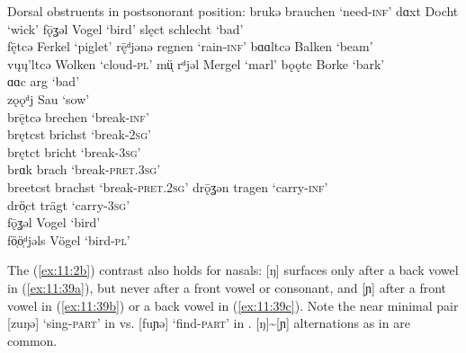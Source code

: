 \ea%
\label{ex:11:38}Dorsal obstruents in postsonorant position:
\ea\label{ex:11:38a} brukǝ \tab [brukǝ] \tab brauchen \tab ‘need-\textsc{inf}’ 
\ex\label{ex:11:38b} dɑxt \tab [dɑxt] \tab Docht \tab ‘wick’ 
\ex\label{ex:11:38c} fǭʓəl \tab [fɔːɣəl] \tab Vogel \tab ‘bird’ 
\ex\label{ex:11:38d} slęct \tab [slɛçt] \tab schlecht \tab ‘bad’ \\
    f\={ę}tcə \tab [fɛːçə] \tab Ferkel \tab ‘piglet’ 
\ex\label{ex:11:38e} r\={ę}ᵈjənə \tab [rɛːʝənə] \tab regnen \tab ‘rain-\textsc{inf}’ 
\ex\label{ex:11:38f} bɑɑltcə \tab [bɑːlçə] \tab Balken \tab ‘beam’ \\
    vųų’ltcə \tab [vʊːlçə] \tab Wolken \tab ‘cloud-\textsc{pl}’ 
\ex\label{ex:11:38g} müͅ\textsuperscript{} rᵈjəl \tab [mʏrʝəl] \tab Mergel \tab ‘marl’ 
\ex\label{ex:11:38h} bǫǫtc \tab [bɔːç] \tab Borke \tab ‘bark’ \\
    ɑɑc \tab [ɑːç] \tab arg \tab ‘bad’ \\
\ex\label{ex:11:38i}  zǫǫᵈj \tab [zɔːʝ] \tab Sau \tab ‘sow’ \\
\ex\label{ex:11:38j}    br\={ę}tcə \tab [breːçə] \tab brechen \tab ‘break-\textsc{inf}’ \\
    brętcst \tab [brɛçst] \tab brichst \tab ‘break-\textsc{2sg}’ \\
    brętct \tab [brɛçt] \tab bricht \tab ‘break-\textsc{3sg}’ \\
    brɑk \tab [brɑk] \tab brach \tab ‘break-\textsc{pret}.\textsc{3sg}’ \\
    breetcst \tab [breːçst] \tab brachst \tab ‘break-\textsc{pret}.\textsc{2sg}’ 
\ex\label{ex:11:38k} drǭʓən \tab [drɔːɣən] \tab tragen \tab ‘carry-\textsc{inf}’ \\
    drö̜ct \tab [drœçt] \tab trägt \tab ‘carry-\textsc{3sg}’ \\
    fǭʓəl \tab [fɔːɣəl] \tab Vogel \tab ‘bird’ \\
    fö̜ö̜ᵈjəls \tab [fœːʝəls] \tab Vögel \tab ‘bird-\textsc{pl}’ 
\z 
\z 

The (\ref{ex:11:2b}) contrast also holds for nasals: [ŋ] surfaces only after a back vowel in (\ref{ex:11:39a}), but never after a front vowel or consonant, and [ɲ] after a front vowel in (\ref{ex:11:39b}) or a back vowel in (\ref{ex:11:39c}). Note the near minimal pair [zuŋə] ‘sing-\textsc{part}’ in  vs. [fuɲə] ‘find-\textsc{part}’ in . [ŋ]{\textasciitilde}[ɲ] alternations as in  are common.

